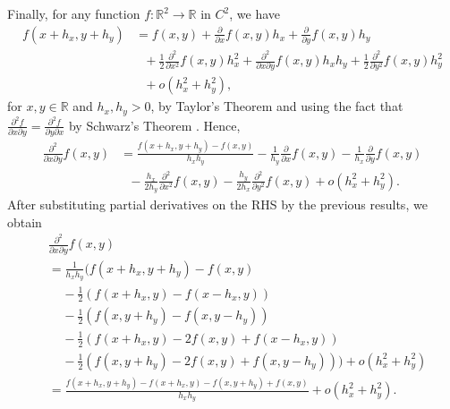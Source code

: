 \documentclass[english]{article}
\numberwithin{equation}{section}
\numberwithin{figure}{section}
\theoremstyle{bolddescit}
\theoremstyle{definition}
\theoremstyle{definition}
\theoremstyle{plain}
\theoremstyle{plain}
\theoremstyle{bolddesc}
\theoremstyle{plain}
\theoremstyle{remark}
\begin{document}
Finally, for any function $f : \mathbb{R}^2 \to \mathbb{R}$ in $C^2$, we have
\begin{align*}
  f(x+h_x, y+h_y)
  &= f(x,y) + \frac{\partial}{\partial x} f(x,y) h_x + \frac{\partial}{\partial y} f(x,y) h_y\\
  &\ \ \ + \frac{1}{2} \frac{\partial^2}{\partial x^2} f(x,y) h_x^2 + \frac{\partial^2}{\partial x \partial y} f(x,y) h_x h_y + \frac{1}{2} \frac{\partial^2}{\partial y^2} f(x,y) h_y^2\\
  &\ \ \ + o(h_x^2 + h_y^2),
\end{align*}
for $x,y \in \mathbb{R}$ and $h_x, h_y > 0$, by Taylor's Theorem and using the fact that $\frac{\partial^2 f}{\partial x \partial y} = \frac{\partial^2 f}{\partial y \partial x}$ by Schwarz's Theorem . Hence,
\begin{align*}
  \frac{\partial^2}{\partial x \partial y} f(x,y)
  &= \frac{f(x+h_x, y+h_y) - f(x,y)}{h_x h_y} - \frac{1}{h_y}\frac{\partial}{\partial x} f(x,y) - \frac{1}{h_x} \frac{\partial}{\partial y} f(x,y)\\
  &\ \ \ - \frac{h_x}{2 h_y} \frac{\partial^2}{\partial x^2} f(x,y) - \frac{h_y}{2 h_x} \frac{\partial^2}{\partial y^2} f(x,y) + o(h_x^2 + h_y^2).
\end{align*}
After substituting partial derivatives on the RHS by the previous results, we obtain
\begin{align*}
  &\frac{\partial^2}{\partial x \partial y} f(x,y)\\
  &= \frac{1}{h_x h_y} \Bigg( f(x+h_x, y+h_y) - f(x,y)\\
  &\ \ \ \ \ - \frac{1}{2} \left(f(x+h_x,y) - f(x-h_x,y)\right)\\
  &\ \ \ \ \ - \frac{1}{2} \left(f(x,y+h_y) - f(x,y-h_y)\right)\\
  &\ \ \ \ \ - \frac{1}{2} \left(f(x+h_x,y) - 2 f(x,y) + f(x-h_x,y)\right)\\
  &\ \ \ \ \ - \frac{1}{2} \left(f(x,y+h_y) - 2 f(x,y) + f(x,y-h_y) \right) \Bigg) + o(h_x^2 + h_y^2)\\
  &= \frac{f(x+h_x, y+h_y) - f(x+h_x,y) - f(x,y+h_y) + f(x,y)}{h_x h_y} + o(h_x^2 + h_y^2).
\end{align*}
\end{document}
